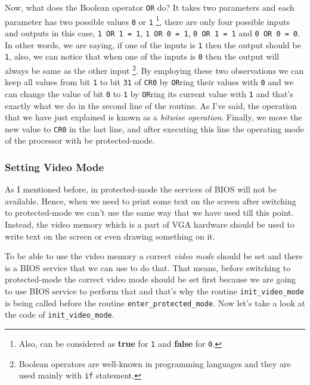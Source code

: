 Now, what does the Boolean operator \lstinline!OR! do? It takes two
parameters and each parameter has two possible values \lstinline!0! or
\lstinline!1! \footnote{Also, can be considered as \textbf{true} for
  \lstinline!1! and \textbf{false} for \lstinline!0!.}, there are only
four possible inputs and outputs in this case, \lstinline!1 OR 1 = 1!,
\lstinline!1 OR 0 = 1!, \lstinline!0 OR 1 = 1! and
\lstinline!0 OR 0 = 0!. In other words, we are saying, if one of the
inputs is \lstinline!1! then the output should be \lstinline!1!, also,
we can notice that when one of the inputs is \lstinline!0! then the
output will always be same as the other input \footnote{Boolean
  operators are well-known in programming languages and they are used
  mainly with \lstinline!if! statement.}. By employing these two
observations we can keep all values from bit \lstinline!1! to bit
\lstinline!31! of \lstinline!CR0! by \lstinline!OR!ring their values
with \lstinline!0! and we can change the value of bit \lstinline!0! to
\lstinline!1! by \lstinline!OR!ring its current value with \lstinline!1!
and that's exactly what we do in the second line of the routine. As I've
said, the operation that we have just explained is known as a
\emph{bitwise operation}. Finally, we move the new value to
\lstinline!CR0! in the last line, and after executing this line the
operating mode of the processor with be protected-mode.

\subsubsection{Setting Video Mode}\label{setting-video-mode}

As I mentioned before, in protected-mode the services of BIOS will not
be available. Hence, when we need to print some text on the screen after
switching to protected-mode we can't use the same way that we have used
till this point. Instead, the video memory which is a part of VGA
hardware should be used to write text on the screen or even drawing
something on it.

To be able to use the video memory a correct \emph{video mode} should be
set and there is a BIOS service that we can use to do that. That means,
before switching to protected-mode the correct video mode should be set
first because we are going to use BIOS service to perform that and
that's why the routine \lstinline!init_video_mode! is being called
before the routine \lstinline!enter_protected_mode!. Now let's take a
look at the code of \lstinline!init_video_mode!.

